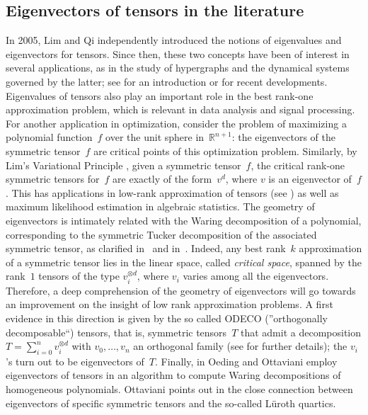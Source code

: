 \documentclass[a4paper, 11pt, reqno]{amsart}
\theoremstyle{plain}
\theoremstyle{definition}
\newcommand{\R}{\mathbb{R}}
\begin{document}
\subsection*{Eigenvectors of tensors in the literature}
In 2005, Lim \cite{Lim} and Qi \cite{Qi} independently introduced the notions of eigenvalues and eigenvectors for tensors.
Since then, these two concepts have been of interest in several applications,
as in the study of hypergraphs and the dynamical systems governed by the latter;
see \cite[Section~4]{QZ} for an introduction or \cite{GMV} for recent developments.
Eigenvalues of tensors also play an important role in the best rank-one approximation problem,
which is relevant in data analysis and signal processing.
For another application in optimization, consider the problem of maximizing a polynomial function~$f$ over the unit sphere in~$\R^{n+1}$: 
the eigenvectors of the symmetric tensor~$f$ are critical points of this optimization problem. 
Similarly, by Lim's Variational Principle \cite{Lim}, given a symmetric tensor~$f$, the critical rank-one symmetric tensors for~$f$ are exactly of the form~$v^d$, where $v$ is an eigenvector of~$f$.
This has applications in low-rank approximation of tensors (see \cite{OttSod}) as well as maximum likelihood estimation in algebraic statistics. 
The geometry of eigenvectors is intimately related with the Waring decomposition of a polynomial, 
corresponding to the symmetric Tucker decomposition of the associated symmetric tensor, 
as clarified in~\cite{DOT} and in~\cite{Ott}. 
Indeed, any best rank~$k$ approximation of a symmetric tensor lies in the linear space, 
called \emph{critical space}, spanned by the rank~$1$ tensors of the type $v_i^{\otimes d}$, where $v_i$ varies among all the eigenvectors. 
Therefore, a deep comprehension of the geometry of eigenvectors will
go towards an improvement on the insight of low rank approximation problems.
A first evidence in this direction is given by the so called ODECO (''orthogonally decomposable``) tensors, 
that is, symmetric tensors~$T$ that admit a decomposition
$T = \sum _{i=0}^n v_i ^{\otimes d}$ with $v_0, \dotsc, v_n$ an orthogonal family (see \cite{Rob, BDHE} for further details);
the $v_i$'s turn out to be eigenvectors of~$T$.
Finally, in \cite{OO} Oeding and Ottaviani employ eigenvectors of tensors in an algorithm to compute Waring decompositions of homogeneous polynomials.
Ottaviani points out in \cite[Section~8]{Ottaviani24} the close connection between eigenvectors of specific symmetric tensors and the so-called L\"uroth quartics. 
\end{document}
